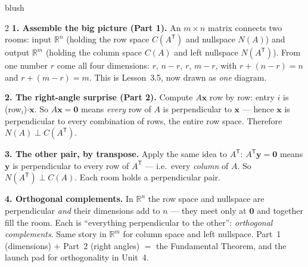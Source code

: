 \documentclass[10pt]{article}
\newcommand{\xx}{\mathbf{x}}
\newcommand{\yy}{\mathbf{y}}
\newcommand{\zero}{\mathbf{0}}
\newcommand{\T}{\mathsf{T}}
\begin{document}
\begin{skillbox}[Lesson]{blush}
\begin{multicols}{2}
\textbf{1. Assemble the big picture (Part 1).} An $m\times n$ matrix connects two rooms: input $\mathbb{R}^n$
(holding the row space $C(A^{\T})$ and nullspace $N(A)$) and output $\mathbb{R}^m$ (holding the column space
$C(A)$ and left nullspace $N(A^{\T})$). From one number $r$ come all four dimensions: $r$, $n-r$, $r$, $m-r$,
with $r+(n-r)=n$ and $r+(m-r)=m$. This is Lesson~3.5, now drawn as \emph{one} diagram.

\textbf{2. The right-angle surprise (Part 2).} Compute $A\xx$ row by row: entry $i$ is (row$_i$)$\cdot\xx$.
So $A\xx=\zero$ means \emph{every} row of $A$ is perpendicular to $\xx$ --- hence $\xx$ is perpendicular to
every combination of rows, the entire row space. Therefore $N(A)\perp C(A^{\T})$.

\columnbreak

\textbf{3. The other pair, by transpose.} Apply the same idea to $A^{\T}$: $A^{\T}\yy=\zero$ means $\yy$ is
perpendicular to every row of $A^{\T}$ --- i.e.\ every \emph{column} of $A$. So $N(A^{\T})\perp C(A)$. Each
room holds a perpendicular pair.

\textbf{4. Orthogonal complements.} In $\mathbb{R}^n$ the row space and nullspace are perpendicular
\emph{and} their dimensions add to $n$ --- they meet only at $\zero$ and together fill the room. Each is
``everything perpendicular to the other'': \emph{orthogonal complements}. Same story in $\mathbb{R}^m$ for
column space and left nullspace. Part~1 (dimensions) $+$ Part~2 (right angles) $=$ the Fundamental Theorem,
and the launch pad for orthogonality in Unit~4.
\end{multicols}
\end{skillbox}
\end{document}
